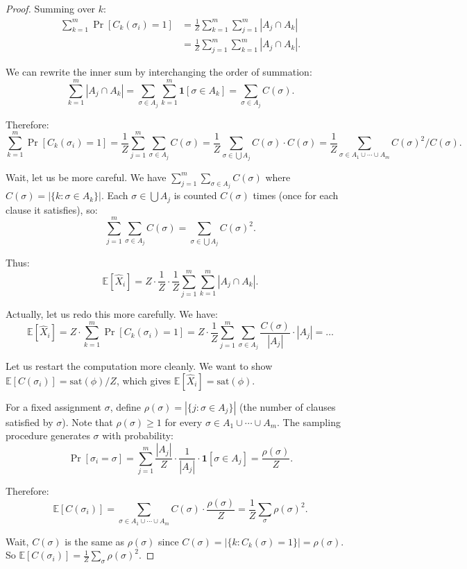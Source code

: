 \documentclass[twoside,12pt]{book}
\theoremstyle{plain}
\theoremstyle{definition}
\theoremstyle{remark}
\begin{document}
\begin{proof}
Summing over $k$:
\begin{align*}
\sum_{k=1}^m \Pr[C_k(\sigma_i) = 1]
&= \frac{1}{Z} \sum_{k=1}^m \sum_{j=1}^m |A_j \cap A_k| \\
&= \frac{1}{Z} \sum_{j=1}^m \sum_{k=1}^m |A_j \cap A_k|.
\end{align*}

We can rewrite the inner sum by interchanging the order of summation:
\[
\sum_{k=1}^m |A_j \cap A_k| = \sum_{\sigma \in A_j} \sum_{k=1}^m \mathbf{1}[\sigma \in A_k] = \sum_{\sigma \in A_j} C(\sigma).
\]

Therefore:
\[
\sum_{k=1}^m \Pr[C_k(\sigma_i) = 1] = \frac{1}{Z} \sum_{j=1}^m \sum_{\sigma \in A_j} C(\sigma) = \frac{1}{Z} \sum_{\sigma \in \bigcup A_j} C(\sigma) \cdot C(\sigma) = \frac{1}{Z} \sum_{\sigma \in A_1 \cup \cdots \cup A_m} C(\sigma)^2 / C(\sigma).
\]

Wait, let us be more careful. We have $\sum_{j=1}^m \sum_{\sigma \in A_j} C(\sigma)$ where $C(\sigma) = |\{k : \sigma \in A_k\}|$. Each $\sigma \in \bigcup A_j$ is counted $C(\sigma)$ times (once for each clause it satisfies), so:
\[
\sum_{j=1}^m \sum_{\sigma \in A_j} C(\sigma) = \sum_{\sigma \in \bigcup A_j} C(\sigma)^2.
\]

Thus:
\[
\mathbb{E}[\hat{X}_i] = Z \cdot \frac{1}{Z} \cdot \frac{1}{Z} \sum_{j=1}^m \sum_{k=1}^m |A_j \cap A_k|.
\]

Actually, let us redo this more carefully. We have:
\[
\mathbb{E}[\hat{X}_i] = Z \cdot \sum_{k=1}^m \Pr[C_k(\sigma_i) = 1] = Z \cdot \frac{1}{Z} \sum_{j=1}^m \sum_{\sigma \in A_j} \frac{C(\sigma)}{|A_j|} \cdot |A_j| = \ldots
\]

Let us restart the computation more cleanly. We want to show $\mathbb{E}[C(\sigma_i)] = \text{sat}(\phi)/Z$, which gives $\mathbb{E}[\hat{X}_i] = \text{sat}(\phi)$.

For a fixed assignment $\sigma$, define $\rho(\sigma) = |\{j : \sigma \in A_j\}|$ (the number of clauses satisfied by $\sigma$). Note that $\rho(\sigma) \geq 1$ for every $\sigma \in A_1 \cup \cdots \cup A_m$. The sampling procedure generates $\sigma$ with probability:
\[
\Pr[\sigma_i = \sigma] = \sum_{j=1}^m \frac{|A_j|}{Z} \cdot \frac{1}{|A_j|} \cdot \mathbf{1}[\sigma \in A_j] = \frac{\rho(\sigma)}{Z}.
\]

Therefore:
\[
\mathbb{E}[C(\sigma_i)] = \sum_{\sigma \in A_1 \cup \cdots \cup A_m} C(\sigma) \cdot \frac{\rho(\sigma)}{Z} = \frac{1}{Z} \sum_{\sigma} \rho(\sigma)^2.
\]

Wait, $C(\sigma)$ is the same as $\rho(\sigma)$ since $C(\sigma) = |\{k : C_k(\sigma) = 1\}| = \rho(\sigma)$. So $\mathbb{E}[C(\sigma_i)] = \frac{1}{Z} \sum_\sigma \rho(\sigma)^2$.


\end{proof}
\end{document}
